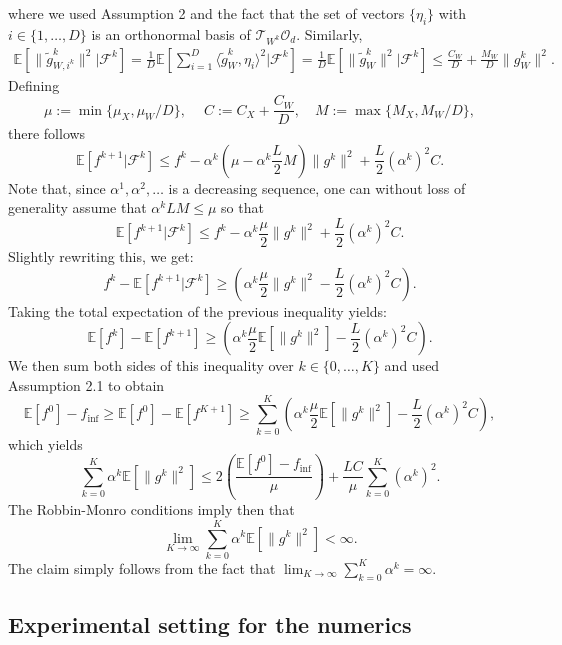 \documentclass{article}
\def \E {\mathbb{E}}
\def \O {\mathcal{O}}
\def \calF {\mathcal{F}}
\begin{document}
where we used Assumption 2 and the fact that the set of vectors $\{\eta_i\}$ with $i \in \{1, \dots, D\}$ is an orthonormal basis of $\mathcal{T}_{W^k} \O_d$. Similarly, 
\begin{equation*}
\begin{aligned}
    \E \left[ \| \tilde{g}_{W,i^k}^k \|^2|\calF^{k}\right]  = \frac{1}{D}  \E \left[ \sum_{i  = 1}^D \langle \tilde{g}_{W}^k, \eta_i\rangle^2 | \calF^k \right] = \frac{1}{D}  \E \left[ \|\tilde{g}_{W}^k \|^2 | \calF^k \right] \leq \frac{C_W}{D} + \frac{M_W}{D} \|g_{W}^k \|^2.
    \end{aligned}
\end{equation*}
Defining
\[\mu := \min \{\mu_X, \mu_W/D\}, \quad \ C:= C_X+ \frac{C_W}{D}, \quad M := \max \{M_X, M_W/D\}, \]
there follows
\[ \E \left[ f^{k+1} | \calF^k \right] \leq  f^k - \alpha^k (\mu - \alpha^k \frac{L}{2} M)  \| g^k \|^2 + \frac{L}{2} (\alpha^k)^2 C. \]
Note that, since $\alpha^1, \alpha^2, \dots$ is a decreasing sequence, one can without loss of generality assume that $\alpha^k L M \leq \mu$ so that 
\[  \E \left[ f^{k+1} | \calF^k \right] \leq   f^k - \alpha^k \frac{\mu}{2}  \| g^k \|^2 + \frac{L}{2} (\alpha^k)^2 C . \]
Slightly rewriting this, we get:
\[ f^k - \E \left[f^{k+1}|\calF^{k}\right] \geq  \left( \alpha^k \frac{\mu}{2} \| g^k \|^2 - \frac{L}{2} (\alpha^k)^2 C \right). \]
Taking the total expectation of the previous inequality yields: 
\[  \E \left[ f^k \right] - \E \left[f^{k+1}\right] \geq  \left( \alpha^k \frac{\mu}{2} \E \left[ \| g^k \|^2 \right] - \frac{L}{2} (\alpha^k)^2 C \right). \]
We then sum both sides of this inequality over $k \in \{0, \dots, K\}$ and used Assumption 2.1 to obtain 
\[ \E \left[f^0\right] - f_{\inf} \geq  \E \left[ f^0 \right] - \E \left[f^{K+1}\right] \geq \sum_{k = 0}^K \left( \alpha^k \frac{\mu}{2} \E \left[ \| g^k \|^2 \right] - \frac{L}{2} (\alpha^k)^2 C \right), \]
which yields
\[ \sum_{k = 0}^K \alpha^k \E\left[\| g^k\|^2 \right] \leq 2 \left(\frac{\E\left[ f^0\right] - f_{\inf}}{\mu}\right) +  \frac{LC}{\mu} \sum_{k = 0}^K(\alpha^k)^2. \]
The Robbin-Monro conditions imply then that 
\[ \lim_{K \to \infty} \sum_{k = 0}^K \alpha^k \E\left[\| g^k\|^2 \right] < \infty. \]
The claim simply follows from the fact that $\lim_{K \to \infty} \sum_{k = 0}^K \alpha^k = \infty$.
\vspace{2em}


\subsection{Experimental setting for the numerics}
\end{document}
